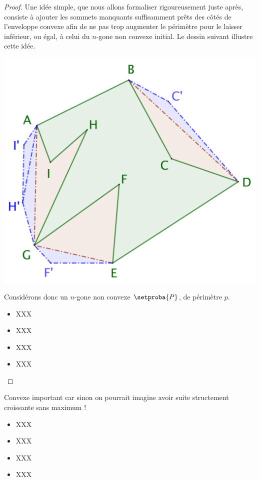\begin{proof}
	Une idée simple, que nous allons formaliser rigoureusement juste après, consiste à ajouter les sommets manquants suffisamment prêts des côtés de l'enveloppe convexe afin de ne pas trop augmenter le périmètre pour le laisser inférieur, ou égal, à celui du $n$-gone non convexe initial. Le dessin suivant illustre cette idée.	
	
	\begin{center}
		\includegraphics[scale=.4]{content/polygon/polygon-convex-hull-distortion.png}
	\end{center}

	Considérons donc un $n$-gone non convexe $\setproba{P}$, de périmètre $p$.
	\begin{itemize}
		\item XXX

		\item XXX

		\item XXX

		\item XXX
	\end{itemize}
\end{proof}




\begin{remark}
	Convexe important car sinon on pourrait imagine avoir suite structement croissante sans maximum !
	\begin{itemize}
		\item XXX

		\item XXX

		\item XXX

		\item XXX
	\end{itemize}
\end{remark}


